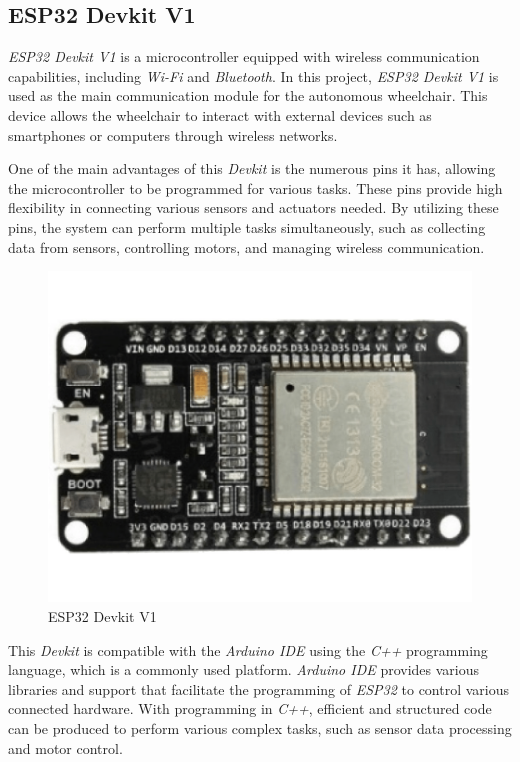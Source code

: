 \subsection{ESP32 Devkit V1}
\label{subsec:ESP32 Devkit V1}

\emph{ESP32 Devkit V1} is a microcontroller equipped with wireless communication capabilities, including \emph{Wi-Fi} and \emph{Bluetooth}. In this project, \emph{ESP32 Devkit V1} is used as the main communication module for the autonomous wheelchair. This device allows the wheelchair to interact with external devices such as smartphones or computers through wireless networks.

One of the main advantages of this \emph{Devkit} is the numerous pins it has, allowing the microcontroller to be programmed for various tasks. These pins provide high flexibility in connecting various sensors and actuators needed. By utilizing these pins, the system can perform multiple tasks simultaneously, such as collecting data from sensors, controlling motors, and managing wireless communication.

\begin{figure}[H]
  \centering
  \includegraphics[scale=0.25]{gambar/ESP32-DEVKIT-V1-board.png}
  \caption{ESP32 Devkit V1}
  \label{fig:ESP32DevkitV1}
\end{figure}

This \emph{Devkit} is compatible with the \emph{Arduino IDE} using the \emph{C++} programming language, which is a commonly used platform. \emph{Arduino IDE} provides various libraries and support that facilitate the programming of \emph{ESP32} to control various connected hardware. With programming in \emph{C++}, efficient and structured code can be produced to perform various complex tasks, such as sensor data processing and motor control.

